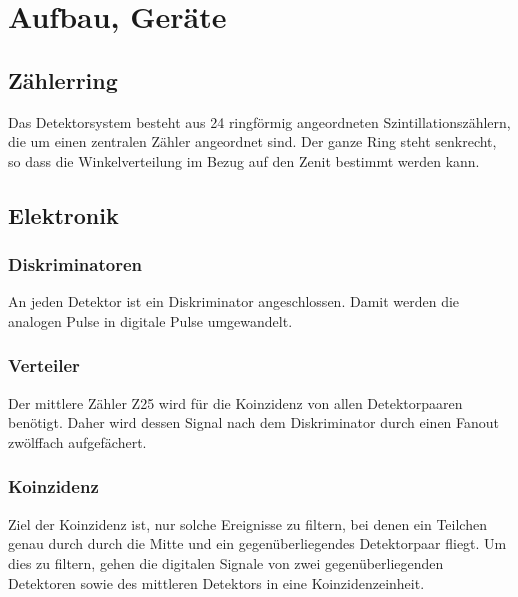 \documentclass[11pt, ngerman, fleqn, DIV=15, headinclude, BCOR=2cm]{scrreprt}
\begin{document}
\section{Aufbau, Geräte}

\subsection{Zählerring}

Das Detektorsystem besteht aus 24 ringförmig angeordneten
Szintillationszählern, die um einen zentralen Zähler angeordnet sind. Der ganze
Ring steht senkrecht, so dass die Winkelverteilung im Bezug auf den Zenit
bestimmt werden kann.


\subsection{Elektronik}

\subsubsection{Diskriminatoren}

An jeden Detektor ist ein Diskriminator angeschlossen. Damit werden die
analogen Pulse in digitale Pulse umgewandelt.

\subsubsection{Verteiler}

Der mittlere Zähler Z25 wird für die Koinzidenz von allen Detektorpaaren
benötigt. Daher wird dessen Signal nach dem Diskriminator durch einen Fanout
zwölffach aufgefächert.

\subsubsection{Koinzidenz}

Ziel der Koinzidenz ist, nur solche Ereignisse zu filtern, bei denen ein
Teilchen genau durch durch die Mitte und ein gegenüberliegendes Detektorpaar
fliegt. Um dies zu filtern, gehen die digitalen Signale von zwei
gegenüberliegenden Detektoren sowie des mittleren Detektors in eine
Koinzidenzeinheit.
\end{document}
